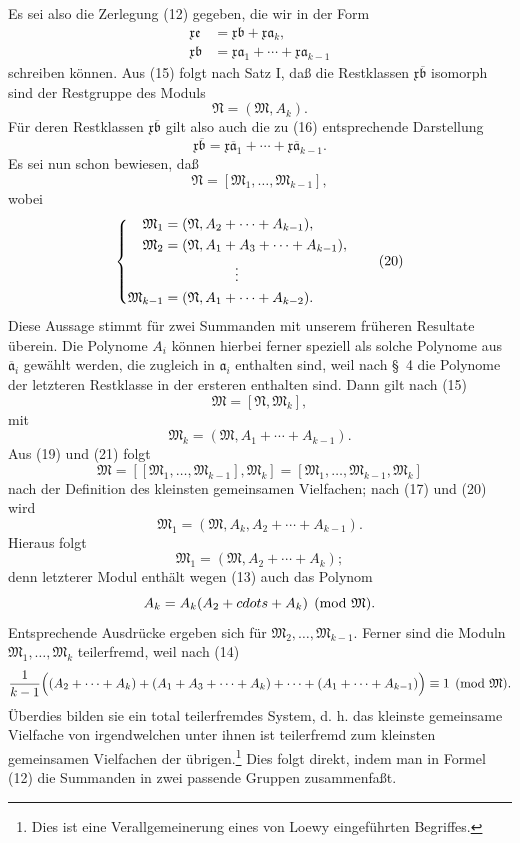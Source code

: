 \documentclass[11pt]{article}
\newcommand{\mM}{\mathfrak{M}}
\newcommand{\mN}{\mathfrak{N}}
\newcommand{\ma}{\mathfrak{a}}
\newcommand{\mb}{\mathfrak{b}}
\newcommand{\mx}{\mathfrak{x}}
\newcommand{\me}{\mathfrak{e}}
\begin{document}
Es sei also die Zerlegung (12) gegeben, die wir in der Form
\begin{align}
 \mx\me&=\mx\mb+\mx\ma_k,\tag{15}\\
 \mx\mb&=\mx\ma_1+\cdots+\mx\ma_{k-1}\tag{16}
\end{align}
schreiben können. Aus (15) folgt nach Satz I, daß die Restklassen $\mx\overline{\mb}$ isomorph sind der Restgruppe des Moduls
\begin{equation}
 \mN=(\mM,A_k).
\tag{17}
\end{equation}
Für deren Restklassen $\mx\overline{\mb}$ gilt also auch die zu (16) entsprechende Darstellung
\begin{equation}
 \mx\overline{\mb}=\mx\overline{\ma}_1+\cdots+\mx\overline{\ma}_{k-1}.
\tag{18}
\end{equation}
Es sei nun schon bewiesen, daß
\begin{equation}
 \mN=[\mM_1,\ldots,\mM_{k-1}],
\tag{19}
\end{equation}
wobei
\begin{equation}
\left\{
\begin{aligned}
 \mM_1&=(\mN,A_2+\cdots+A_{k-1}),\\
 \mM_2&=(\mN,A_1+A_3+\cdots+A_{k-1}),\\
 &\hspace{1.8cm}\vdots\\
 \mM_{k-1}&=(\mN,A_1+\cdots+A_{k-2}).
\end{aligned}\right.
\tag{20}
\end{equation}
Diese Aussage stimmt für zwei Summanden mit unserem früheren Resultate überein. Die Polynome $A_i$ können hierbei ferner speziell als solche Polynome aus $\overline{\ma}_i$ gewählt werden, die zugleich in $\ma_i$ enthalten sind, weil nach \S~4 die Polynome der letzteren Restklasse in der ersteren enthalten sind. Dann gilt nach (15)
\begin{equation}
 \mM=[\mN,\mM_k],
\tag{21}
\end{equation}
mit
\[
 \mM_k=(\mM,A_1+\cdots+A_{k-1}).
\]
Aus (19) und (21) folgt
\[
 \mM=[[\mM_1,
 \ldots,\mM_{k-1}],\mM_k]=[\mM_1,\ldots,\mM_{k-1},\mM_k]
\]
nach der Definition des kleinsten gemeinsamen Vielfachen; nach (17) und (20) wird
\[
 \mM_1=(\mM,A_k,A_2+\cdots+A_{k-1}).
\]
Hieraus folgt
\[
 \mM_1=(\mM,A_2+\cdots+A_k);
\]
denn letzterer Modul enthält wegen (13) auch das Polynom
\[
 A_k=A_k(A_2+\\cdots+A_k)\pmod{\mM}.
\]
Entsprechende Ausdrücke ergeben sich für $\mM_2,\ldots,\mM_{k-1}$. Ferner sind die Moduln $\mM_1,\ldots,\mM_k$ teilerfremd, weil nach (14)
\[
 \frac{1}{k-1}\Bigl((A_2+
 \cdots+A_k)+(A_1+A_3+\cdots+A_k)+\cdots+(A_1+
 \cdots+A_{k-1})\Bigr)\equiv1\pmod{\mM}.
\]
Überdies bilden sie ein total teilerfremdes System, d. h. das kleinste gemeinsame Vielfache von irgendwelchen unter ihnen ist teilerfremd zum kleinsten gemeinsamen Vielfachen der übrigen.\footnote{Dies ist eine Verallgemeinerung eines von Loewy eingeführten Begriffes.} Dies folgt direkt, indem man in Formel (12) die Summanden in zwei passende Gruppen zusammenfaßt.
\end{document}
